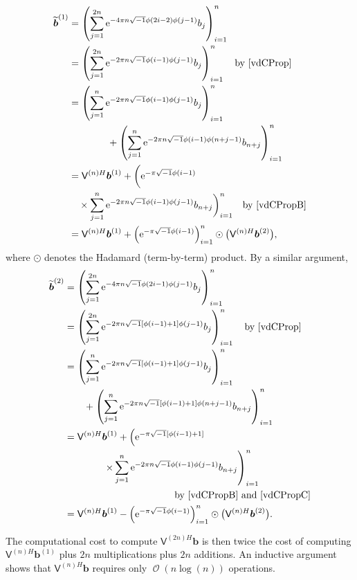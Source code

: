\documentclass[twocolumn]{svjour3}          %
\DeclareMathOperator{\Order}{{\mathcal O}}
\newcommand{\bm}[1]{\boldsymbol{#1}}
\newcommand{\vb}{\bm{b}}
\newcommand{\mV}{\mathsf{V}}
\newcommand{\me}{\mathrm{e}}
\begin{document}
\begin{align*}
\widetilde{\vb}^{(1)} &= \left( \sum_{j=1}^{2n}  \me^{-4 \pi n \sqrt{-1} \phi(2i-2)\phi(j-1)} b_{j} \right)_{i=1}^n \\
&= \left( \sum_{j=1}^{2n}  \me^{-2 \pi n \sqrt{-1} \phi(i-1)\phi(j-1)} b_{j} \right)_{i=1}^n \quad \text{by \eqref{vdCProp}}\\
&= \left( \sum_{j=1}^{n}  \me^{-2 \pi n \sqrt{-1} \phi(i-1)\phi(j-1)} b_{j} \right)_{i=1}^n \quad \\
&\qquad \qquad +  \left( \sum_{j=1}^{n}  \me^{-2 \pi n \sqrt{-1} \phi(i-1)\phi(n+j-1)} b_{n+j} \right)_{i=1}^n \\
&= \mV^{(n)H}\vb^{(1)}  +  \biggl(  \me^{-\pi \sqrt{-1} \phi(i-1)}  \\
& \quad \times \sum_{j=1}^{n}  \me^{-2 \pi n \sqrt{-1} \phi(i-1)\phi(j-1)} b_{n+j} \biggr)_{i=1}^n \quad  \text{by \eqref{vdCPropB}}\\
&= \mV^{(n)H}\vb^{(1)} +  \left(  \me^{-\pi \sqrt{-1} \phi(i-1)} \right)_{i=1}^n \odot \bigl(\mV^{(n)H}\vb^{(2)} \bigr),
\end{align*}
where $\odot$ denotes the Hadamard (term-by-term) product.  By a similar argument, 
\begin{align*}
\widetilde{\vb}^{(2)} &= \left( \sum_{j=1}^{2n}  \me^{-4 \pi n \sqrt{-1} \phi(2i-1)\phi(j-1)} b_{j} \right)_{i=1}^n \\
&= \left( \sum_{j=1}^{2n}  \me^{-2 \pi n \sqrt{-1} [\phi(i-1)+1]\phi(j-1)} b_{j} \right)_{i=1}^n \quad \text{by \eqref{vdCProp}}\\
&= \left( \sum_{j=1}^{n}  \me^{-2 \pi n \sqrt{-1} [\phi(i-1)+1]\phi(j-1)} b_{j} \right)_{i=1}^n \quad \\
&\qquad  +  \left( \sum_{j=1}^{n}  \me^{-2 \pi n \sqrt{-1} [\phi(i-1)+1]\phi(n+j-1)} b_{n+j} \right)_{i=1}^n \\
&= \mV^{(n)H}\vb^{(1)} 
+  \left(  \me^{ -\pi \sqrt{-1} [\phi(i-1) + 1]} \right. 
\\
& \qquad \qquad \left . \times \sum_{j=1}^{n}  \me^{-2 \pi n \sqrt{-1} \phi(i-1)\phi(j-1)} b_{n+j} \right)_{i=1}^n \\
& \hspace{4cm}  \text{by \eqref{vdCPropB} and \eqref{vdCPropC}}\\
&= \mV^{(n)H}\vb^{(1)} -  \left(  \me^{-\pi \sqrt{-1} \phi(i-1)} \right)_{i=1}^n \odot \bigl(\mV^{(n)H}\vb^{(2)} \bigr).
\end{align*}

The computational cost to compute $\mV^{(2n)H}\vb$ is then twice the cost of computing $\mV^{(n)H}\vb^{(1)}$ plus $2n$ multiplications plus $2n$ additions.  An inductive argument shows that $\mV^{(n)H}\vb$ requires only $\Order(n \log(n))$ operations.
\end{document}
